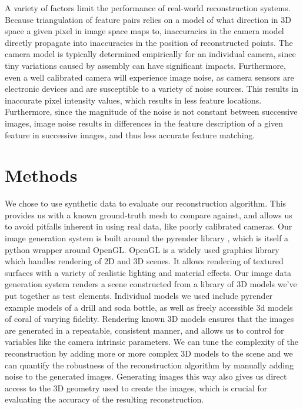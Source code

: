 \documentclass[12pt,letterpaper]{article} %
\begin{document}
A variety of factors limit the performance of real-world reconstruction systems.  Because triangulation of feature pairs relies on a model of what direction in 3D space a given pixel in image space maps to, inaccuracies in the camera model directly propagate into inaccuracies in the position of reconstructed points.  The camera model is typically determined empirically for an individual camera, since tiny variations caused by assembly can have significant impacts.  Furthermore, even a well calibrated camera will experience image noise, as camera sensors are electronic devices and are susceptible to a variety of noise sources.  This results in inaccurate pixel intensity values, which results in less feature locations.  Furthermore, since the magnitude of the noise is not constant between successive images, image noise results in differences in the feature description of a given feature in successive images, and thus less accurate feature matching.

\section{Methods}
We chose to use synthetic data to evaluate our reconstruction algorithm. This provides us with a known ground-truth mesh to compare against, and allows us to avoid pitfalls inherent in using real data, like poorly calibrated cameras.  Our image generation system is built around the pyrender library \cite{pyrender}, which is itself a python wrapper around OpenGL.  OpenGL is a widely used graphics library which handles rendering of 2D and 3D scenes.  It allows rendering of textured surfaces with a variety of realistic lighting and material effects.  Our image data generation system renders a scene constructed from a library of 3D models we’ve put together as test elements.  Individual models we used include pyrender example models of a drill and soda bottle, as well as freely accessible 3d models of coral of varying fidelity.  Rendering known 3D models ensures that the images are generated in a repeatable, consistent manner, and allows us to control for variables like the camera intrinsic parameters.  We can tune the complexity of the reconstruction by adding more or more complex 3D models to the scene and we can quantify the robustness of the reconstruction algorithm by manually adding noise to the generated images.  Generating images this way also gives us direct access to the 3D geometry used to create the images, which is crucial for evaluating the accuracy of the resulting reconstruction.
\end{document}
